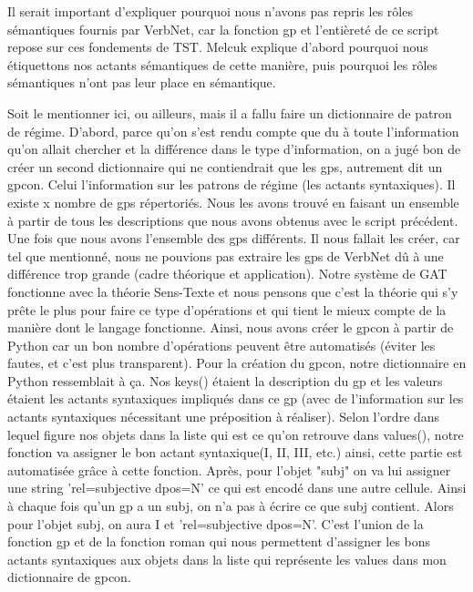 Il serait important d'expliquer pourquoi nous n'avons pas repris les rôles sémantiques fournis par VerbNet, car la fonction gp et l'entièreté de ce script repose sur ces fondements de TST. Melcuk explique d'abord pourquoi nous étiquettons nos actants sémantiques de cette manière, puis pourquoi les rôles sémantiques n'ont pas leur place en sémantique.



Soit le mentionner ici, ou ailleurs, mais il a fallu faire un dictionnaire de patron de régime. D'abord, parce qu'on s'est rendu compte que du à toute l'information qu'on allait chercher et la différence dans le type d'information, on a jugé bon de créer un second dictionnaire qui ne contiendrait que les gps, autrement dit un gpcon. Celui l'information sur les patrons de régime (les actants syntaxiques). Il existe x nombre de gps répertoriés. Nous les avons trouvé en faisant un ensemble à partir de tous les descriptions que nous avons obtenus avec le script précédent. Une fois que nous avons l'ensemble des gps différents. Il nous fallait les créer, car tel que mentionné, nous ne pouvions pas extraire les gps de VerbNet dû à une différence trop grande (cadre théorique et application). Notre système de GAT fonctionne avec la théorie Sens-Texte et nous pensons que c'est la théorie qui s'y prête le plus pour faire ce type d'opérations et qui tient le mieux compte de la manière dont le langage fonctionne. Ainsi, nous avons créer le gpcon à partir de Python car un bon nombre d'opérations peuvent être automatisés (éviter les fautes, et c'est plus transparent). Pour la création du gpcon, notre dictionnaire en Python ressemblait à ça. Nos keys() étaient la description du gp et les valeurs étaient les actants syntaxiques impliqués dans ce gp (avec de l'information sur les actants syntaxiques nécessitant une préposition à réaliser). Selon l'ordre dans lequel figure nos objets dans la liste qui est ce qu'on retrouve dans values(), notre fonction va assigner le bon actant syntaxique(I, II, III, etc.) ainsi, cette partie est automatisée grâce à cette fonction. Après, pour l'objet "subj" on va lui assigner une string 'rel=subjective dpos=N' ce qui est encodé dans une autre cellule. Ainsi à chaque fois qu'un gp a  un subj, on n'a pas à écrire ce que subj contient. Alors pour l'objet subj, on aura I et 'rel=subjective dpos=N'. C'est l'union de la fonction gp et de la fonction roman qui nous permettent d'assigner les bons actants syntaxiques aux objets dans la liste qui représente les values dans mon dictionnaire de gpcon.

